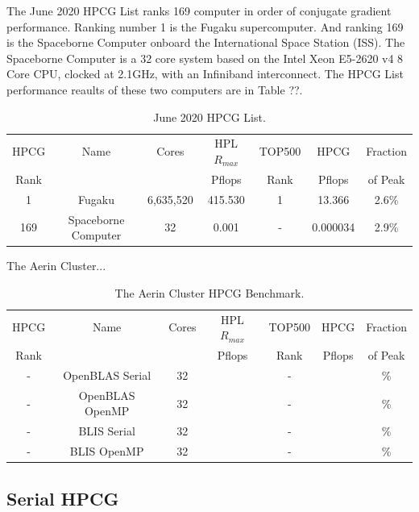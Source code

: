 \documentclass{report}
\begin{document}
The June 2020 HPCG List ranks 169 computer in order of conjugate gradient performance. Ranking number 1 is the Fugaku supercomputer. And ranking 169 is the Spaceborne Computer onboard the International Space Station (ISS). The Spaceborne Computer is a 32 core system based on the Intel Xeon E5-2620 v4 8 Core CPU, clocked at 2.1GHz, with an Infiniband interconnect. The HPCG List performance reaults of these two computers are in Table ??.

\begin{table}[H]
\begin{center}
\begin{tabular}{ |c|c|c|c|c|c|c| } 
\hline
HPCG & Name & Cores & HPL $R_{max}$ & TOP500 & HPCG   & Fraction \\
Rank &      &       & Pflops        & Rank   & Pflops & of Peak  \\
\hline
1 & Fugaku & 6,635,520 & 415.530 & 1 & 13.366 & 2.6\% \\
\hline
169 & Spaceborne Computer & 32 & 0.001 & - & 0.000034 & 2.9\% \\
\hline
\end{tabular}
\end{center}
\caption{\label{tab:table-name}June 2020 HPCG List.}
\end{table}



The Aerin Cluster... 

\begin{table}[H]
\begin{center}
\begin{tabular}{ |c|c|c|c|c|c|c| } 
\hline
HPCG & Name & Cores & HPL $R_{max}$ & TOP500 & HPCG   & Fraction \\
Rank &      &       & Pflops        & Rank   & Pflops & of Peak  \\
\hline
- & OpenBLAS Serial & 32 & & - & & \% \\
\hline
- & OpenBLAS OpenMP & 32 & & - & & \% \\
\hline
- & BLIS Serial & 32 & & - & & \% \\
\hline
- & BLIS OpenMP & 32 & & - & & \% \\
\hline
\end{tabular}
\end{center}
\caption{\label{tab:table-name}The Aerin Cluster HPCG Benchmark.}
\end{table}

%
%
\subsection{Serial HPCG}
\end{document}
